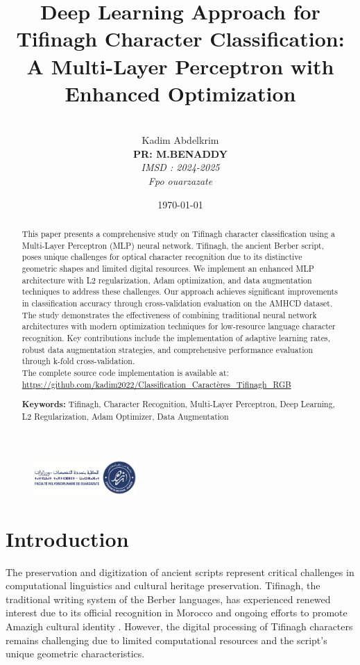 \documentclass[12pt,a4paper]{article}
\title{Deep Learning Approach for Tifinagh Character Classification: A Multi-Layer Perceptron with Enhanced Optimization}
\author{
	\\ Kadim Abdelkrim \\ \textbf{PR: M.BENADDY} \\
	\textit{IMSD : 2024-2025}\\
	\textit{Fpo ouarzazate}
}
\date{\today}
\begin{document}
	\begin{figure}
		\centering
		\includegraphics[width=0.35\textwidth]{fpo.png}
	\end{figure}
	\maketitle
	
	\begin{abstract}
		This paper presents a comprehensive study on Tifinagh character classification using a Multi-Layer Perceptron (MLP) neural network. Tifinagh, the ancient Berber script, poses unique challenges for optical character recognition due to its distinctive geometric shapes and limited digital resources. We implement an enhanced MLP architecture with L2 regularization, Adam optimization, and data augmentation techniques to address these challenges. Our approach achieves significant improvements in classification accuracy through cross-validation evaluation on the AMHCD dataset. The study demonstrates the effectiveness of combining traditional neural network architectures with modern optimization techniques for low-resource language character recognition. Key contributions include the implementation of adaptive learning rates, robust data augmentation strategies, and comprehensive performance evaluation through k-fold cross-validation.\\
			The complete source code implementation is available at:
		\url{https://github.com/kadim2022/Classification_Caractères_Tifinagh_RGB}
		
		\textbf{Keywords:} Tifinagh, Character Recognition, Multi-Layer Perceptron, Deep Learning, L2 Regularization, Adam Optimizer, Data Augmentation
	\end{abstract}
	
	\section{Introduction}
	
	The preservation and digitization of ancient scripts represent critical challenges in computational linguistics and cultural heritage preservation. Tifinagh, the traditional writing system of the Berber languages, has experienced renewed interest due to its official recognition in Morocco and ongoing efforts to promote Amazigh cultural identity \cite{tifinagh_history}. However, the digital processing of Tifinagh characters remains challenging due to limited computational resources and the script's unique geometric characteristics.
	
\end{document}
